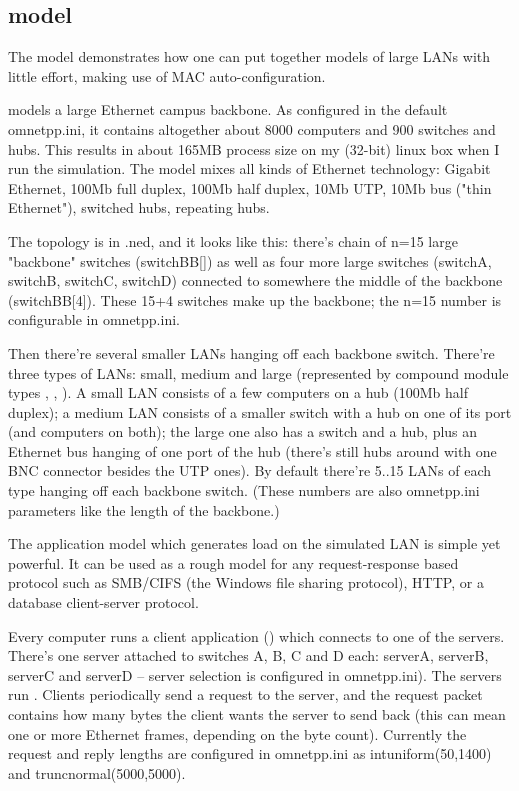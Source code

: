 \subsection{ model}

The  model demonstrates how one can put together models of large
LANs with little effort, making use of MAC auto-configuration.

 models a large Ethernet campus backbone. As configured in the
default omnetpp.ini, it contains altogether about 8000 computers
and 900 switches and hubs. This results in about 165MB process size
on my (32-bit) linux box when I run the simulation.
The model mixes all kinds of Ethernet technology: Gigabit Ethernet,
100Mb full duplex, 100Mb half duplex, 10Mb UTP, 10Mb bus ("thin Ethernet"),
switched hubs, repeating hubs.

The topology is in .ned, and it looks like this: there's chain
of n=15 large "backbone" switches (switchBB[]) as well as four more
large switches (switchA, switchB, switchC, switchD) connected to
somewhere the middle of the backbone (switchBB[4]). These 15+4 switches
make up the backbone; the n=15 number is configurable in omnetpp.ini.

Then there're several smaller LANs hanging off each backbone switch.
There're three types of LANs: small, medium and large (represented by
compound module types , , ). A small LAN
consists of a few computers on a hub (100Mb half duplex); a medium
LAN consists of a smaller switch with a hub on one of its port
(and computers on both); the large one also has a switch and a hub,
plus an Ethernet bus hanging of one port of the hub (there's still hubs
around with one BNC connector besides the UTP ones).
By default there're 5..15 LANs of each type hanging off each backbone
switch. (These numbers are also omnetpp.ini parameters like the length
of the backbone.)

The application model which generates load on the simulated LAN is
simple yet powerful. It can be used as a rough model for any
request-response based protocol such as SMB/CIFS (the Windows file
sharing protocol), HTTP, or a database client-server protocol.

Every computer runs a client application () which connects
to one of the servers. There's one server attached to switches A, B,
C and D each: serverA, serverB, serverC and serverD -- server selection
is configured in omnetpp.ini). The servers run .
Clients periodically send a request to the server, and the request
packet contains how many bytes the client wants the server to send back
(this can mean one or more Ethernet frames, depending on the byte count).
 Currently the request and reply lengths are configured in omnetpp.ini
as intuniform(50,1400) and truncnormal(5000,5000).

